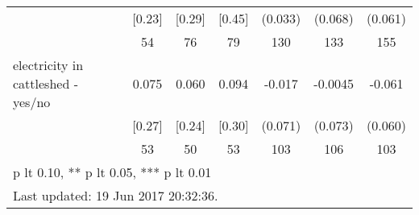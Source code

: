 \begin{table}[htbp]
\begin{tabular*}{1\hsize}{@{\hskip\tabcolsep\extracolsep\fill}l*{1}{cccccc}}
                                &   [0.23]&   [0.29]&   [0.45]&  (0.033)         &  (0.068)         &  (0.061)         \\
                                &       54&       76&       79&      130         &      133         &      155         \\
electricity in cattleshed - yes/no&    0.075&    0.060&    0.094&   -0.017         &  -0.0045         &   -0.061         \\
                                &   [0.27]&   [0.24]&   [0.30]&  (0.071)         &  (0.073)         &  (0.060)         \\
                                &       53&       50&       53&      103         &      106         &      103         \\
\bottomrule
\multicolumn{7}{l}{\footnotesize * p lt 0.10, ** p lt 0.05, *** p lt 0.01}\\
\multicolumn{7}{l}{\footnotesize Last updated: 19 Jun 2017 20:32:36.}\\
\end{tabular*}
\end{table}
